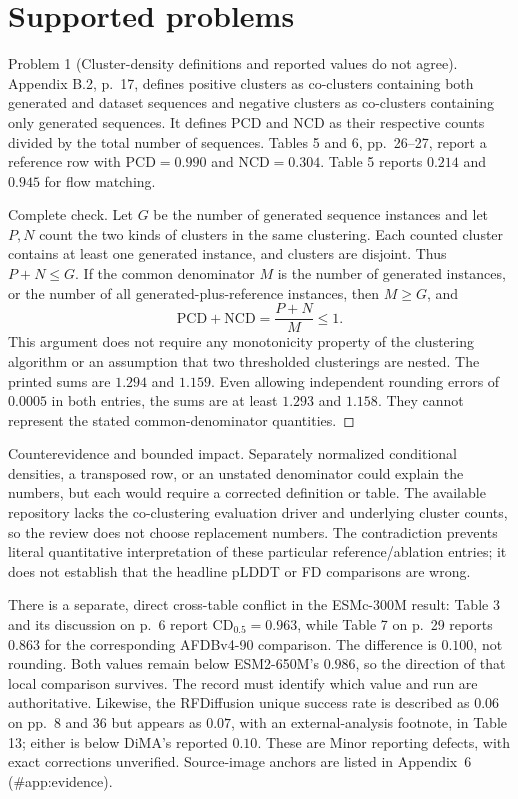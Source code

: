 \documentclass[10pt]{article}
\begin{document}
\section*{Supported problems}
Problem 1 (Cluster-density definitions and reported values do not agree).  Appendix B.2, p. 17, defines positive clusters as co-clusters containing both generated and dataset sequences and negative clusters as co-clusters containing only generated sequences. It defines PCD and NCD as their respective counts divided by the total number of sequences. Tables 5 and 6, pp. 26–27, report a reference row with \(\mathrm{PCD}=0.990\) and \(\mathrm{NCD}=0.304\). Table 5 reports \(0.214\) and \(0.945\) for flow matching.\par
Complete check. Let \(G\) be the number of generated sequence instances and let \(P,N\) count the two kinds of clusters in the same clustering. Each counted cluster contains at least one generated instance, and clusters are disjoint. Thus \(P+N\leq G\). If the common denominator \(M\) is the number of generated instances, or the number of all generated-plus-reference instances, then \(M\geq G\), and \[\mathrm{PCD}+\mathrm{NCD}=\frac{P+N}{M}\leq 1.\] This argument does not require any monotonicity property of the clustering algorithm or an assumption that two thresholded clusterings are nested. The printed sums are \(1.294\) and \(1.159\). Even allowing independent rounding errors of \(0.0005\) in both entries, the sums are at least \(1.293\) and \(1.158\). They cannot represent the stated common-denominator quantities. ◻\par
Counterevidence and bounded impact. Separately normalized conditional densities, a transposed row, or an unstated denominator could explain the numbers, but each would require a corrected definition or table. The available repository lacks the co-clustering evaluation driver and underlying cluster counts, so the review does not choose replacement numbers. The contradiction prevents literal quantitative interpretation of these particular reference/ablation entries; it does not establish that the headline pLDDT or FD comparisons are wrong.\par
There is a separate, direct cross-table conflict in the ESMc-300M result: Table 3 and its discussion on p. 6 report \(\mathrm{CD}_{0.5}=0.963\), while Table 7 on p. 29 reports \(0.863\) for the corresponding AFDBv4-90 comparison. The difference is \(0.100\), not rounding. Both values remain below ESM2-650M’s \(0.986\), so the direction of that local comparison survives. The record must identify which value and run are authoritative. Likewise, the RFDiffusion unique success rate is described as \(0.06\) on pp. 8 and 36 but appears as \(0.07\), with an external-analysis footnote, in Table 13; either is below DiMA’s reported \(0.10\). These are Minor reporting defects, with exact corrections unverified. Source-image anchors are listed in Appendix 6 (\#app:evidence).\par
\end{document}
